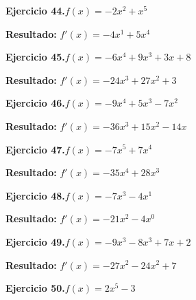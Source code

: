 \documentclass[10pt,a4paper]{article}
\begin{document}
\begin{ejbox}
\textbf{Ejercicio 44.}\quad $f(x) = -2x^{2} + x^{5}$
\end{ejbox}

\begin{solbox}
\textbf{Resultado:} \(\displaystyle f'(x) = -4x^{1} + 5x^{4}\)
\end{solbox}

\begin{ejbox}
\textbf{Ejercicio 45.}\quad $f(x) = -6x^{4} +9x^{3} +3x +8$
\end{ejbox}

\begin{solbox}
\textbf{Resultado:} \(\displaystyle f'(x) = -24x^{3} +27x^{2} +3\)
\end{solbox}

\newpage
\begin{ejbox}
\textbf{Ejercicio 46.}\quad $f(x) = -9x^4 +5x^3 -7x^2$
\end{ejbox}

\begin{solbox}
\textbf{Resultado:} \(\displaystyle f'(x) = -36x^3 +15x^2 -14x\)
\end{solbox}

\begin{ejbox}
\textbf{Ejercicio 47.}\quad $f(x) = -7x^{5} +7x^{4}$
\end{ejbox}

\begin{solbox}
\textbf{Resultado:} \(\displaystyle f'(x) = -35x^{4} +28x^{3}\)
\end{solbox}

\begin{ejbox}
\textbf{Ejercicio 48.}\quad $f(x) = -7x^{3} -4x^{1}$
\end{ejbox}

\begin{solbox}
\textbf{Resultado:} \(\displaystyle f'(x) = -21x^{2} -4x^{0}\)
\end{solbox}

\newpage
\begin{ejbox}
\textbf{Ejercicio 49.}\quad $f(x) = -9x^{3} -8x^{3} +7x +2$
\end{ejbox}

\begin{solbox}
\textbf{Resultado:} \(\displaystyle f'(x) = -27x^{2} -24x^{2} +7\)
\end{solbox}

\begin{ejbox}
\textbf{Ejercicio 50.}\quad $f(x) = 2x^{5} -3$
\end{ejbox}
\end{document}
